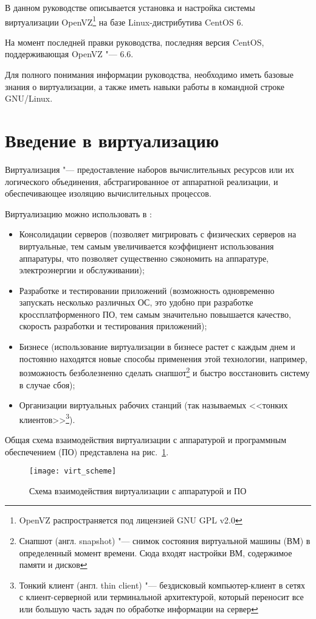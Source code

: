 В данном руководстве описывается установка и настройка системы виртуализации OpenVZ\footnote{OpenVZ распространяется под лицензией GNU GPL v2.0} 
на базе Linux-дистрибутива CentOS 6.

На момент последней правки руководства, последняя версия CentOS, поддерживающая OpenVZ "--- 6.6.

Для полного понимания информации руководства, необходимо иметь базовые знания о виртуализации, а также иметь навыки работы в командной строке GNU/Linux.

\section{Введение в виртуализацию}

Виртуализация "--- предоставление наборов вычислительных ресурсов или их логического объединения, абстрагированное от аппаратной реализации, и обеспечивающее изоляцию вычислительных процессов. 

Виртуализацию можно использовать в \cite{sevconf2014}:
\begin{itemize}
    \item Консолидации серверов (позволяет мигрировать с физических серверов на виртуальные, тем самым увеличивается коэффициент использования аппаратуры, что позволяет существенно сэкономить на аппаратуре, электроэнергии и обслуживании);
    \item Разработке и тестировании приложений (возможность одновременно запускать несколько различных ОС, это удобно при разработке кроссплатформенного ПО, тем самым значительно повышается качество, скорость разработки и тестирования приложений);
    \item Бизнесе (использование виртуализации в бизнесе растет с каждым днем и постоянно находятся новые способы применения этой технологии, например, возможность безболезненно сделать снапшот\footnote{Снапшот (англ. snapshot) "--- снимок состояния виртуальной машины (ВМ) в определенный момент времени. Сюда входят настройки ВМ, содержимое памяти и дисков} и быстро восстановить систему в случае сбоя);
    \item Организации виртуальных рабочих станций (так называемых <<тонких клиентов>>\footnote{Тонкий клиент (англ. thin client) "--- бездисковый компьютер-клиент в сетях с клиент-серверной или терминальной архитектурой, который переносит все или большую часть задач по обработке информации на сервер}).
\end{itemize}

Общая схема взаимодействия виртуализации с аппаратурой и программным обеспечением (ПО) представлена на рис.~\ref{pic:virt_scheme}.
\begin{figure}[ht]
    \centering
	\texttt{[image: virt\_scheme]}
	\caption{Схема взаимодействия виртуализации с аппаратурой и ПО}\label{pic:virt_scheme}
\end{figure}

